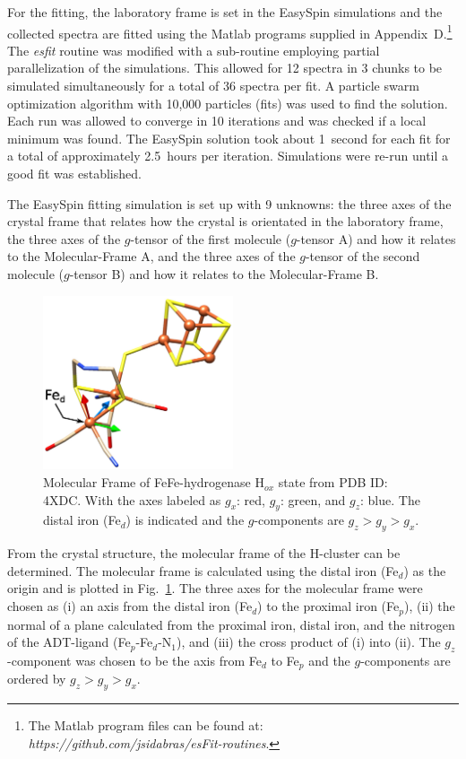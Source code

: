 For the fitting, the laboratory frame is set in the EasySpin simulations and the collected spectra are fitted using the Matlab programs supplied in Appendix~D.\footnote{The Matlab program files can be found at: \textit{https://github.com/jsidabras/esFit-routines}.} The \textit{esfit} routine was modified with a sub-routine employing partial parallelization of the simulations. This allowed for 12 spectra in 3 chunks to be simulated simultaneously for a total of 36 spectra per fit. A particle swarm optimization algorithm with 10,000 particles (fits) was used to find the solution. Each run was allowed to converge in 10 iterations and was checked if a local minimum was found. The EasySpin solution took about 1~second for each fit for a total of approximately 2.5~hours per iteration. Simulations were re-run until a good fit was established.

The EasySpin fitting simulation is set up with 9 unknowns: the three axes of the crystal frame that relates how the crystal is orientated in the laboratory frame, the three axes of the $g$-tensor of the first molecule ($g$-tensor A) and how it relates to the Molecular-Frame A, and the three axes of the $g$-tensor of the second molecule ($g$-tensor B) and how it relates to the Molecular-Frame B. 

\begin{figure}[ht]
 \centering
 \includegraphics[width=0.5\textwidth]{Kapitel/Ch1-images/Ch2-MolFrame.eps}
 \caption[Molecular Frame of FeFe-hydrogenase H$_{ox}$ state.]{Molecular Frame of FeFe-hydrogenase H$_{ox}$ state from PDB ID: 4XDC. With the axes labeled as $g_x$: red, $g_y$: green, and $g_z$: blue. The distal iron (Fe$_d$) is indicated and the $g$-components are $g_z>g_y>g_x$.}
 \label{fig:MolecularFrame}
\end{figure}

From the crystal structure, the molecular frame of the H-cluster can be determined. The molecular frame is calculated using the distal iron (Fe$_d$) as the origin and is plotted in Fig.~\ref{fig:MolecularFrame}. The three axes for the molecular frame were chosen as (i) an axis from the distal iron (Fe$_d$) to the proximal iron (Fe$_p$), (ii) the normal of a plane calculated from the proximal iron, distal iron, and the nitrogen of the ADT-ligand  (Fe$_p$-Fe$_d$-N$_1$), and (iii) the cross product of (i) into (ii). The $g_z$-component was chosen to be the axis from Fe$_d$ to Fe$_p$ and the $g$-components are ordered by $g_z>g_y>g_x$. 

